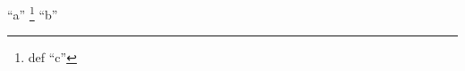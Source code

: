 \documentclass[11pt]{article}
\author{Au}
\date{2026-01-01}
\title{}
\begin{document}
\tableofcontents

``a'' \footnote{def ``c''} ``b''
\end{document}
